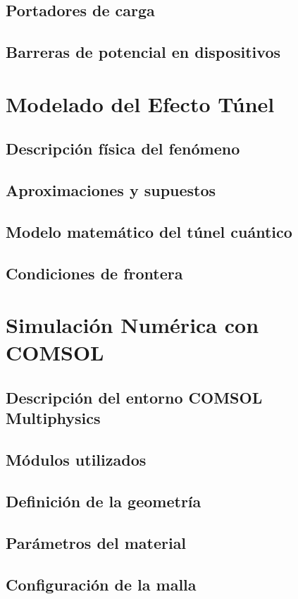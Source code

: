 \documentclass[12pt]{article}
\begin{document}
\subsection{Portadores de carga}
\subsection{Barreras de potencial en dispositivos}

\section{Modelado del Efecto Túnel}
\subsection{Descripción física del fenómeno}
\subsection{Aproximaciones y supuestos}
\subsection{Modelo matemático del túnel cuántico}
\subsection{Condiciones de frontera}

\section{Simulación Numérica con COMSOL}
\subsection{Descripción del entorno COMSOL Multiphysics}
\subsection{Módulos utilizados}
\subsection{Definición de la geometría}
\subsection{Parámetros del material}
\subsection{Configuración de la malla}
\end{document}
